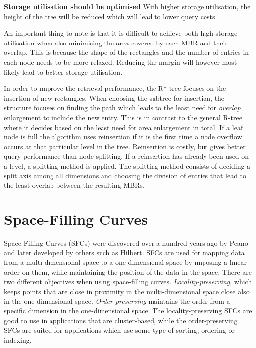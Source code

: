 \noindent
\textbf{Storage utilisation should be optimised}\newline
With higher storage utilisation, the height of the tree will be reduced which will lead to lower query costs. \newline

\noindent
An important thing to note is that it is difficult to achieve both high storage utilisation when also minimising the area covered by each MBR and their overlap. This is because the shape of the rectangles and the number of entries in each node needs to be more relaxed. Reducing the margin will however most likely lead to better storage utilisation. \newline

\noindent
In order to improve the retrieval performance, the R*-tree focuses on the insertion of new rectangles. When choosing the subtree for insertion, the structure focuses on finding the path which leads to the least need for \emph{overlap} enlargement to include the new entry. This is in contrast to the general R-tree where it decides based on the least need for area enlargement in total. If a leaf node is full the algorithm uses reinsertion if it is the first time a node overflow occurs at that particular level in the tree. Reinsertion is costly, but gives better query performance than node splitting. If a reinsertion has already been used on a level, a splitting method is applied. The splitting method consists of deciding a split axis among all dimensions and choosing the division of entries that lead to the least overlap between the resulting MBRs.

\section{Space-Filling Curves}
Space-Filling Curves (SFCs) were discovered over a hundred years ago by Peano\cite{peano} and  later developed by others such as Hilbert\cite{hilbert}. SFCs are used for mapping data from a multi-dimensional space to a one-dimensional space by imposing a linear order on them, while maintaining the position of the data in the space. There are two different objectives when using space-filling curves\cite{IrregularSpace}. \emph{Locality-preserving}, which keeps points that are close in proximity in the multi-dimensional space close also in the one-dimensional space. \emph{Order-preserving} maintains the order from a specific dimension in the one-dimensional space. The locality-preserving SFCs are good to use in applications that are cluster-based, while the order-preserving SFCs are suited for applications which use some type of sorting, ordering or indexing. \newline

